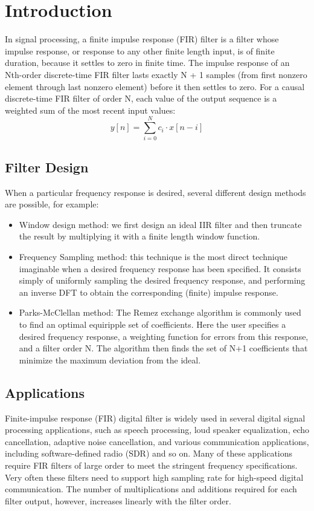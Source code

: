 \section{Introduction}
In signal processing, a finite impulse response (FIR) filter is a filter whose impulse response, or response to any other finite length input, is of finite duration, because it settles to zero in finite time. 
The impulse response of an Nth-order discrete-time FIR filter lasts exactly N + 1 samples (from first nonzero element through last nonzero element) before it then settles to zero.
For a causal discrete-time FIR filter of order N, each value of the output sequence is a weighted sum of the most recent input values:
\begin{equation}
	\label{eq:general}
	 y[n]=\sum_{i=0}^{N}c{_{i}}\cdot x[n-i]
\end{equation}
\subsection{Filter Design}
When a particular frequency response is desired, several different design methods are possible, for example:
\begin{itemize}
  \item {Window design method:} we first design an ideal IIR filter and then truncate the result by multiplying it with a finite length window function.
  \item {Frequency Sampling method:} this technique is the most direct technique imaginable when a desired frequency response has been specified. It consists simply of uniformly sampling the desired frequency response, and performing an inverse DFT to obtain the corresponding (finite) impulse response.
  \item {Parks-McClellan method:} The Remez exchange algorithm is commonly used to find an optimal equiripple set of coefficients. Here the user specifies a desired frequency response, a weighting function for errors from this response, and a filter order N. The algorithm then finds the set of N+1 coefficients that minimize the maximum deviation from the ideal. 
\end{itemize}
\subsection{Applications}Finite-impulse response (FIR) digital filter is widely used in several digital signal processing applications, such as speech processing, loud speaker equalization, echo cancellation, adaptive noise cancellation, and various communication applications, including software-defined radio (SDR) and so on. Many of these applications require FIR filters of large order to meet the stringent frequency specifications. Very often these filters need to support high sampling rate for high-speed digital communication. The number of multiplications and additions required for each filter output, however, increases linearly with the filter order. 
